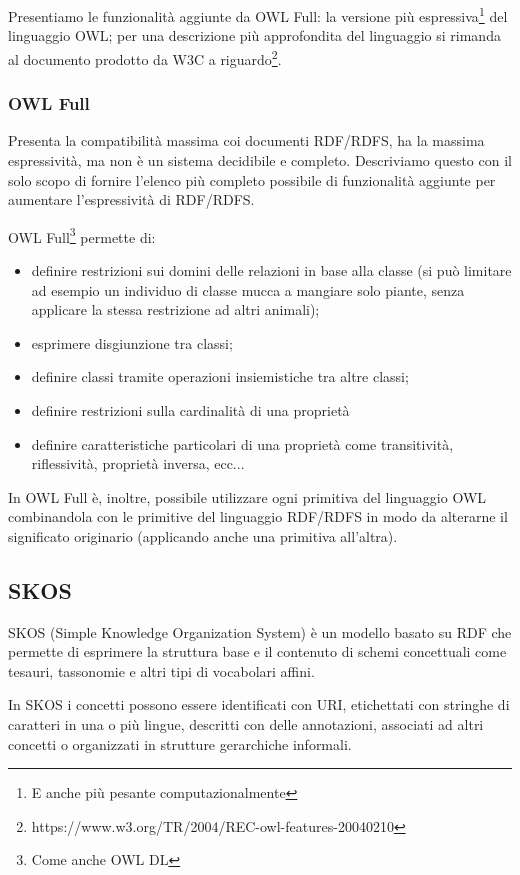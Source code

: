 Presentiamo le funzionalità aggiunte da OWL Full: la versione più espressiva\footnote{E anche più pesante computazionalmente} del linguaggio OWL; per una descrizione più approfondita del linguaggio si rimanda al documento prodotto da W3C a riguardo\footnote{https://www.w3.org/TR/2004/REC-owl-features-20040210}.
\subsubsection{OWL Full}
Presenta la compatibilità massima coi documenti RDF/RDFS, ha la massima espressività, ma non è un sistema decidibile e completo. Descriviamo questo con il solo scopo di fornire l'elenco più completo possibile di funzionalità aggiunte per aumentare l'espressività di RDF/RDFS.

OWL Full\footnote{Come anche OWL DL} permette di:
\begin{itemize}
	\item definire restrizioni sui domini delle relazioni in base alla classe (si può limitare ad esempio un individuo di classe mucca a mangiare solo piante, senza applicare la stessa restrizione ad altri animali);
	\item esprimere disgiunzione tra classi;
	\item definire classi tramite operazioni insiemistiche tra altre classi;
	\item definire restrizioni sulla cardinalità di una proprietà
	\item definire caratteristiche particolari di una proprietà come transitività, riflessività, proprietà inversa, ecc...
\end{itemize}

In OWL Full è, inoltre, possibile utilizzare ogni primitiva del linguaggio OWL combinandola con le primitive del linguaggio RDF/RDFS in modo da alterarne il significato originario (applicando anche una primitiva all'altra).
\subsection{SKOS}
SKOS (Simple Knowledge Organization System) è un modello basato su RDF che permette di esprimere la struttura base e il contenuto di schemi concettuali come tesauri, tassonomie e altri tipi di vocabolari affini\cite{isaac2009skos}.

In SKOS i concetti possono essere identificati con URI, etichettati con stringhe di caratteri in una o più lingue, descritti con delle annotazioni, associati ad altri concetti o organizzati in strutture gerarchiche informali\cite{miles2009skos}.

